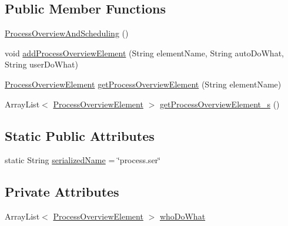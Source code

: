 \subsection*{Public Member Functions}
\begin{DoxyCompactItemize}
\item 
\hyperlink{classit_1_1isislab_1_1masonassisteddocumentation_1_1_o_d_d_1_1_process_overview_and_scheduling_a807d08df01b3111f2df276392bbc5bd3}{Process\-Overview\-And\-Scheduling} ()
\item 
void \hyperlink{classit_1_1isislab_1_1masonassisteddocumentation_1_1_o_d_d_1_1_process_overview_and_scheduling_aec831eb0e4e7a0fc7c6df51dfe671b9f}{add\-Process\-Overview\-Element} (String element\-Name, String auto\-Do\-What, String user\-Do\-What)
\item 
\hyperlink{classit_1_1isislab_1_1masonassisteddocumentation_1_1_o_d_d_1_1_process_overview_element}{Process\-Overview\-Element} \hyperlink{classit_1_1isislab_1_1masonassisteddocumentation_1_1_o_d_d_1_1_process_overview_and_scheduling_abb5ce4e354cbe330da7d75f4144a662a}{get\-Process\-Overview\-Element} (String element\-Name)
\item 
Array\-List$<$ \hyperlink{classit_1_1isislab_1_1masonassisteddocumentation_1_1_o_d_d_1_1_process_overview_element}{Process\-Overview\-Element} $>$ \hyperlink{classit_1_1isislab_1_1masonassisteddocumentation_1_1_o_d_d_1_1_process_overview_and_scheduling_a9981a3feb3c0f8bef12fbdb54f3280f0}{get\-Process\-Overview\-Element\-\_\-s} ()
\end{DoxyCompactItemize}
\subsection*{Static Public Attributes}
\begin{DoxyCompactItemize}
\item 
static String \hyperlink{classit_1_1isislab_1_1masonassisteddocumentation_1_1_o_d_d_1_1_process_overview_and_scheduling_a810836fbb98b18bbfe685700d5060a6a}{serialized\-Name} = \char`\"{}process.\-ser\char`\"{}
\end{DoxyCompactItemize}
\subsection*{Private Attributes}
\begin{DoxyCompactItemize}
\item 
Array\-List$<$ \hyperlink{classit_1_1isislab_1_1masonassisteddocumentation_1_1_o_d_d_1_1_process_overview_element}{Process\-Overview\-Element} $>$ \hyperlink{classit_1_1isislab_1_1masonassisteddocumentation_1_1_o_d_d_1_1_process_overview_and_scheduling_a49308d0d5d6ef19e3cdf25e5b8fdd798}{who\-Do\-What}
\end{DoxyCompactItemize}
